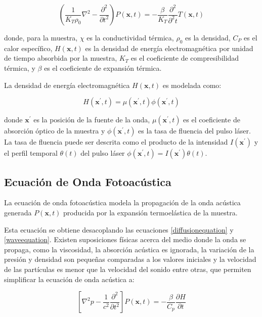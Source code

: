 \begin{equation}
    (\frac{1}{K_{T}\rho_{0}}\nabla^2 - \frac{\partial^2}{\partial t^2})P(\mathbf{x}, t) = -\frac{\beta}{K_{T}}\frac{\partial^2}{\partial^2 t}T(\mathbf{x}, t)
    \label{waveequation}
\end{equation}

donde, para la muestra, $\chi$ es la conductividad térmica, $\rho_{0}$ es la densidad, $C_{P}$ es el calor específico, $H(\mathbf{x}, t)$ es la densidad de energía electromagnética por unidad de tiempo absorbida por la muestra, $K_{T}$ es el coeficiente de compresibilidad térmica, y $\beta$ es el coeficiente de expansión térmica.

La densidad de energía electromagnética $H(\mathbf{x}, t)$ es modelada como:

\begin{equation}
    H({\mathbf{x}^{\prime}}, t) = \mu({\mathbf{x}^{\prime}}, t)\phi({\mathbf{x}^{\prime}}, t)
\end{equation}

donde $\mathbf{x}^{\prime}$ es la posición de la fuente de la onda, $\mu(\mathbf{x}^{\prime}, t)$ es el coeficiente de absorción óptico de la muestra y $\phi(\mathbf{x}^{\prime}, t)$ es la tasa de fluencia del pulso láser. La tasa de fluencia puede ser descrita como el producto de la intensidad $I(\mathbf{x}^{\prime})$ y el perfil temporal $\theta(t)$ del pulso láser $\phi(\mathbf{x}^{\prime}, t) = I(\mathbf{x}^{\prime})\theta(t)$.

\subsection{Ecuación de Onda Fotoacústica}\label{sec:waveequationPA}
La ecuación de onda fotoacústica modela la propagación de la onda acústica generada $P(\mathbf{x}, t)$ producida por la expansión termoelástica de la muestra.

Esta ecuación se obtiene desacoplando las ecuaciones \ref{diffusionequation} y \ref{waveequation}. Existen suposiciones físicas acerca del medio donde la onda se propaga, como la viscosidad, la absorción acústica es ignorada, la variación de la presión y densidad son pequeñas comparadas a los valores iniciales y la velocidad de las partículas es menor que la velocidad del sonido entre otras, que permiten simplificar la ecuación de onda acústica a:

\begin{equation}
    \left[\nabla^2 p - \frac{1}{c^2}\frac{\partial^2 }{\partial t^2}\right]P(\mathbf{x}, t) = -\frac{\beta}{C_p}\frac{\partial H}{\partial t}
\end{equation}

